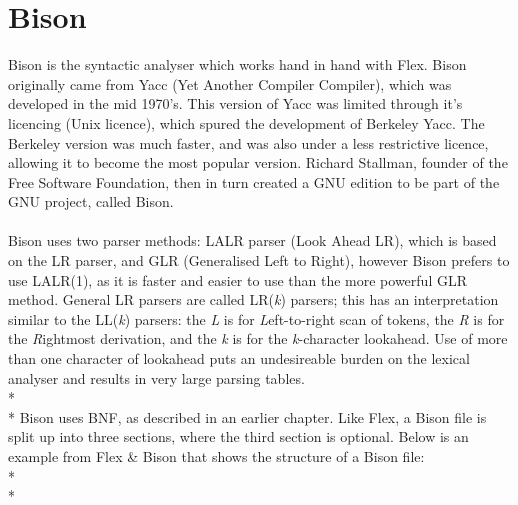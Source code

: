\documentclass[12pt]{report}
\begin{document}
\section{Bison}\label{sec:bison}
Bison is the syntactic analyser which works hand in hand with Flex.  Bison originally came from Yacc (Yet Another Compiler Compiler), which was developed in the mid 1970's.  This version of Yacc was limited through it's licencing (Unix licence), which spured the development of Berkeley Yacc.  The Berkeley version was much faster, and was also under a less restrictive licence, allowing it to become the most popular version.  Richard Stallman, founder of the Free Software Foundation, then in turn created a GNU edition to be part of the GNU project, called Bison.\\
\\
Bison uses two parser methods: LALR parser (Look Ahead LR), which is based on the LR parser, and GLR (Generalised Left to Right), however Bison prefers to use LALR(1), as it is faster and easier to use than the more powerful GLR method.
General LR parsers are called LR(\textit{k}) parsers; this has an interpretation similar to the LL(\textit{k}) parsers: the \textit{L} is for \textit{L}eft-to-right scan of tokens, the \textit{R} is for the \textit{R}ightmost derivation, and the \textit{k} is for the \textit{k}-character lookahead.  Use of more than one character of lookahead puts an undesireable burden on the lexical analyser and results in very large parsing tables. \citep{compilerconstruction92}
\\*
\\*
Bison uses BNF, as described in an earlier chapter.  Like Flex, a Bison file is split up into three sections, where the third section is optional.  Below is an example from Flex \& Bison that shows the structure of a Bison file:\\*
\\*
\end{document}
